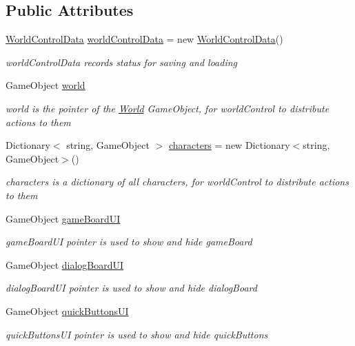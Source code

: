 \subsection*{Public Attributes}
\begin{DoxyCompactItemize}
\item 
\hyperlink{class_world_control_data}{World\+Control\+Data} \hyperlink{class_world_control_a61aa6f540da8869b1b1dc8af6adead26}{world\+Control\+Data} = new \hyperlink{class_world_control_data}{World\+Control\+Data}()
\begin{DoxyCompactList}\small\item\em world\+Control\+Data records status for saving and loading \end{DoxyCompactList}\item 
Game\+Object \hyperlink{class_world_control_a9e1cb13fdda96c502e83d41f52bda761}{world}
\begin{DoxyCompactList}\small\item\em world is the pointer of the \hyperlink{class_world}{World} Game\+Object, for world\+Control to distribute actions to them \end{DoxyCompactList}\item 
Dictionary$<$ string, Game\+Object $>$ \hyperlink{class_world_control_a01b7489307ad256a65a5020d046fcf7b}{characters} = new Dictionary$<$string, Game\+Object$>$()
\begin{DoxyCompactList}\small\item\em characters is a dictionary of all characters, for world\+Control to distribute actions to them \end{DoxyCompactList}\item 
Game\+Object \hyperlink{class_world_control_a596eb15f8e1fd7dc89f3ee9f2e24666e}{game\+Board\+UI}
\begin{DoxyCompactList}\small\item\em game\+Board\+UI pointer is used to show and hide game\+Board \end{DoxyCompactList}\item 
Game\+Object \hyperlink{class_world_control_ae4ce29fc615324ada4f6d68d96c3bc45}{dialog\+Board\+UI}
\begin{DoxyCompactList}\small\item\em dialog\+Board\+UI pointer is used to show and hide dialog\+Board \end{DoxyCompactList}\item 
Game\+Object \hyperlink{class_world_control_a753656d6a6074ef842b3fe2717479883}{quick\+Buttons\+UI}
\begin{DoxyCompactList}\small\item\em quick\+Buttons\+UI pointer is used to show and hide quick\+Buttons \end{DoxyCompactList}\item 

\end{DoxyCompactItemize}
